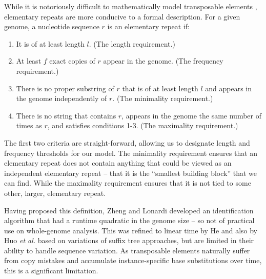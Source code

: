 \documentclass{bmcart}
\begin{document}
While it is notoriously difficult to mathematically model transposable
elements \cite{Bao:2002}, elementary repeats are more conducive to a
formal description.  For a given genome, a nucleotide sequence $r$ is
an elementary repeat if:
\begin{enumerate}
\item It is of at least length $l$.  (The length requirement.)
\item At least $f$ exact copies of $r$ appear in the genome.  (The
  frequency requirement.)
\item There is no proper substring of $r$ that is of at least length
  $l$ and appears in the genome independently of $r$. (The minimality
  requirement.)
\item There is no string that contains $r$, appears in the genome
  the same number of times as $r$, and satisfies conditions 1-3.  (The
  maximality requirement.)
\end{enumerate}
The first two criteria are straight-forward, allowing us to designate
length and frequency thresholds for our model.  The minimality
requirement ensures that an elementary repeat does not contain
anything that could be viewed as an independent elementary repeat --
that it is the ``smallest building block'' that we can find.  While
the maximality requirement ensures that it is not tied to some other, larger,
elementary repeat.


Having proposed this definition, Zheng and Lonardi developed an
identification algorithm that had a runtime quadratic in the genome
size -- so not of practical use on whole-genome analysis.  This was
refined to linear time by He and also by Huo {\it et al.}
\cite{He:2006gpa,Huo:2009hoa} based on variations of suffix tree
approaches, but are limited
in their ability to handle sequence variation.  As transposable
elements naturally suffer from copy mistakes and accumulate
instance-specific base substitutions over time, this is a significant
limitation.
\end{document}

